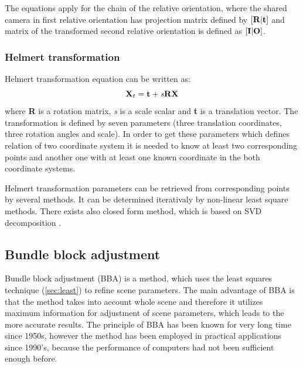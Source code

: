 \documentclass[a4paper,12pt]{article}
\newcommand{\ematr}[1]{
{\bf #1}
}
\newcommand{\evect}[1]{
{\bf #1}
}
\newcommand{\escal}[1]{
{\it #1}
}
\begin{document}
The equations apply for the chain of the relative orientation, where the shared camera in first relative orientation has 
projection matrix defined by $[\ematr{R}|\evect{t}]$ and matrix of the transformed second relative orientation is 
defined as $[\ematr{I}|\ematr{O}]$.

\subsubsection{Helmert transformation}
\label{sec:helmert}

Helmert transformation equation can be written as:
\begin{equation}
\ematr{X}_{t} = \evect{t} + \escal{s}\ematr{R}\evect{X} \\
\end{equation}
where \ematr{R} is a rotation matrix, \escal{s} is a scale scalar and  \evect{t} is a translation vector.
The transformation is defined by seven parameters (three translation coordinates, three rotation angles and scale).
In order to get these parameters which defines relation of two coordinate system it is needed to know at least two corresponding points and  another one with 
at least one known coordinate in the both coordinate systems. 


Helmert transformation parameters can be retrieved from corresponding points by several methods. It can be determined
iterativaly by non-linear least square methods. There exists also closed form method, which is based on SVD decomposition
\cite{sjoberg2013closed}.


\subsection{Bundle block adjustment}

Bundle block adjustment (BBA) is a method, which uses the least squares technique (\ref{sec:least}) to refine scene parameters. 
The main advantage of BBA is that the method takes into account whole scene and therefore it utilizes 
maximum information for adjustment of scene parameters, which leads to the more accurate results.
The principle of BBA has been known for very long time since 1950s,
however the method has been employed in practical applications since 1990's, because the performance of computers had not been 
sufficient enough before. 
\end{document}
